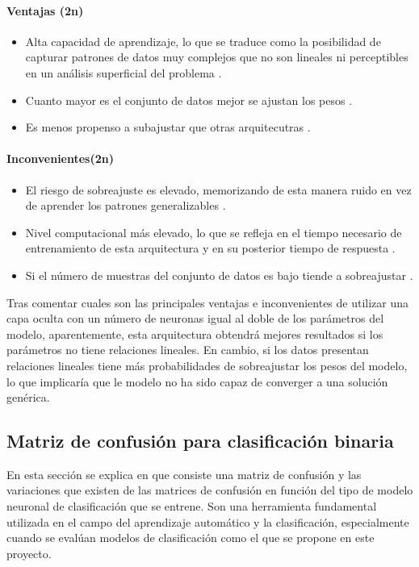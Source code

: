 \paragraph{Ventajas (2n)}
\begin{itemize}
	\item Alta capacidad de aprendizaje, lo que se traduce como la posibilidad de capturar patrones de datos muy complejos que no son lineales ni perceptibles en un análisis superficial del problema \cite{goodfellow2016deep}.
	\item Cuanto mayor es el conjunto de datos mejor se ajustan los pesos \cite{sun2017survey}.
	\item Es menos propenso a subajustar que otras arquitecutras \cite{bishop2006pattern}.
\end{itemize}
\paragraph{Inconvenientes(2n)}
\begin{itemize}
	\item El riesgo de sobreajuste es elevado, memorizando de esta manera ruido en vez de aprender los patrones generalizables \cite{bishop2006pattern}.
	\item Nivel computacional más elevado, lo que se refleja en el tiempo necesario de entrenamiento de esta arquitectura y en su posterior tiempo de respuesta \cite{goodfellow2016deep}.
	\item Si el número de muestras del conjunto de datos es bajo tiende a sobreajustar \cite{overfitting2008}.
\end{itemize}

Tras comentar cuales son las principales ventajas e inconvenientes de utilizar una capa oculta con un número de neuronas igual al doble de los parámetros del modelo, aparentemente, esta arquitectura obtendrá mejores resultados si los parámetros no tiene relaciones lineales. En cambio, si los datos presentan relaciones lineales tiene más probabilidades de sobreajustar los pesos del modelo, lo que implicaría que le modelo no ha sido capaz de converger a una solución genérica.


\subsection{Matriz de confusión para clasificación binaria} \label{sec.matriz-consfusion}
En esta sección se explica en que consiste una matriz de confusión y las variaciones que existen de las matrices de confusión en función del tipo de modelo neuronal de clasificación que se entrene. Son una herramienta fundamental utilizada en el campo del aprendizaje automático y la clasificación, especialmente cuando se evalúan modelos de clasificación como el que se propone en este proyecto.


